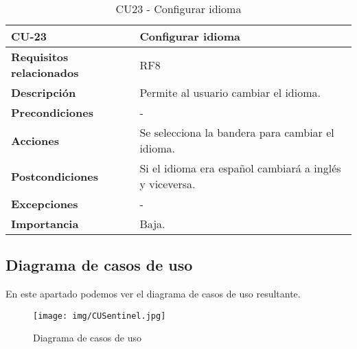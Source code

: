 \begin{table}[ht!]
    \centering
     \resizebox{15cm}{!} {
    \begin{tabular}{|l|l|}
    \hline
         \textbf{CU-23}     &  \textbf{Configurar idioma} \\ \hline
         \textbf{Requisitos relacionados}       & RF8 \\ \hline
         \textbf{Descripción}    & Permite al usuario cambiar el idioma. \\ \hline   
         \textbf{Precondiciones}      & -\\ \hline
         \textbf{Acciones}      & Se selecciona la bandera para cambiar el idioma. \\ \hline
         \textbf{Postcondiciones}       & Si el idioma era español cambiará a inglés y viceversa. \\ \hline
         \textbf{Excepciones}       &- \\ \hline
         \textbf{Importancia}   & Baja.\\
         \hline
    \end{tabular}}
    \caption{CU23 - Configurar idioma}
    \label{tab:my_label}
\end{table}



\begin{landscape}


\subsection{Diagrama de casos de uso}
En este apartado podemos ver el diagrama de casos de uso resultante.

\begin{figure}[h]
    \advance\leftskip-4cm 
    \texttt{[image: img/CUSentinel.jpg]}
    \caption{Diagrama de casos de uso}
\end{figure}
\end{landscape}




